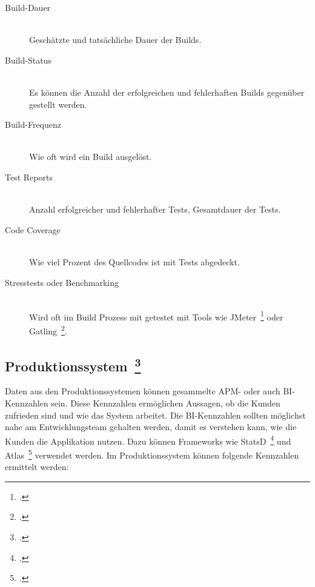 \begin{description}
  \item[Build-Dauer] \hfill \\ Geschätzte und tatsächliche Dauer der Builds.
  \item[Build-Status] \hfill \\ Es können die Anzahl der erfolgreichen und fehlerhaften Builds gegenüber gestellt werden.
  \item[Build-Frequenz] \hfill \\ Wie oft wird ein Build ausgelöst.
  \item[Test Reports] \hfill \\ Anzahl erfolgreicher und fehlerhafter Tests, Gesamtdauer der Tests.
  \item[Code Coverage] \hfill \\ Wie viel Prozent des Quellcodes ist mit Tests abgedeckt.
  \item[Stresstests oder Benchmarking] \hfill \\ Wird oft im Build Prozess mit getestet mit Tools wie JMeter~\footcite[][]{jmeter} oder Gatling~\footcite[][]{gatling}.
\end{description}

\clearpage
\subsection[Produktionssystem]{Produktionssystem~\footcite[vgl.][S.107ff]{davis_agile_2015}}

Daten aus den Produktionssystemen können gesammelte \ac{APM}- oder auch \ac{BI}-Kennzahlen sein.
Diese Kennzahlen ermöglichen Aussagen, ob die Kunden zufrieden sind und wie das System arbeitet.
Die \ac{BI}-Kennzahlen sollten möglichst nahe am Entwicklungsteam gehalten werden, damit es verstehen kann, wie die Kunden die Applikation nutzen.
Dazu können Frameworks wie StatsD~\footcite[][]{statsd} und Atlas~\footcite[][]{atlas} verwendet werden.
Im Produktionssystem können folgende Kennzahlen ermittelt werden:

